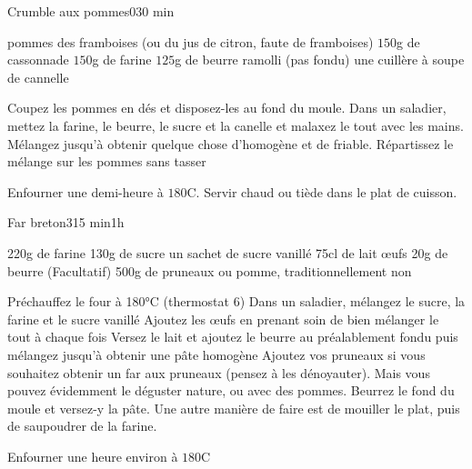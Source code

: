 \begin{recette}{Crumble aux pommes}{0}{}{30 min}
\begin{ingredients}
 pommes
\ingredient des framboises (ou du jus de citron, faute de framboises)
\ingredient $150$g de cassonnade
\ingredient $150$g de farine
\ingredient $125$g de beurre ramolli (pas fondu)
\ingredient une cuillère à soupe de cannelle
\end{ingredients}

\begin{preparation}
\etape Coupez les pommes en dés et disposez-les au fond du moule.
\etape Dans un saladier, mettez la farine, le beurre, le sucre et la canelle et malaxez le tout avec les mains. Mélangez jusqu'à obtenir quelque chose d'homogène et de friable.
\etape Répartissez le mélange sur les pommes sans tasser
\end{preparation}

\begin{cuisson}
Enfourner une demi-heure à $180$\degres C. Servir chaud ou tiède dans le plat de cuisson.
\end{cuisson}
\end{recette}

\begin{recette}{Far breton}{3}{15 min}{1h}
\begin{ingredients}
\ingredient 220g de farine
\ingredient 130g de sucre
\ingredient un sachet de sucre vanillé
\ingredient 75cl de lait
 œufs
\ingredient 20g de beurre
\ingredient (Facultatif) 500g de pruneaux ou pomme, traditionnellement non
\end{ingredients}

\begin{preparation}
\etape Préchauffez le four à 180°C (thermostat 6)
\etape Dans un saladier, mélangez le sucre, la farine et le sucre vanillé
\etape Ajoutez les œufs en prenant soin de bien mélanger le tout à chaque fois
\etape Versez le lait et ajoutez le beurre au préalablement fondu puis mélangez jusqu'à obtenir une pâte homogène
\etape Ajoutez vos pruneaux si vous souhaitez obtenir un far aux pruneaux (pensez à les dénoyauter). Mais vous pouvez 
évidemment le déguster nature, ou avec des pommes.
\etape Beurrez le fond du moule et versez-y la pâte. Une autre manière de faire est de mouiller le plat, puis de saupoudrer de 
la farine.
\end{preparation}

\begin{cuisson}
Enfourner une heure environ à $180$\degres C
\end{cuisson}
\end{recette}

